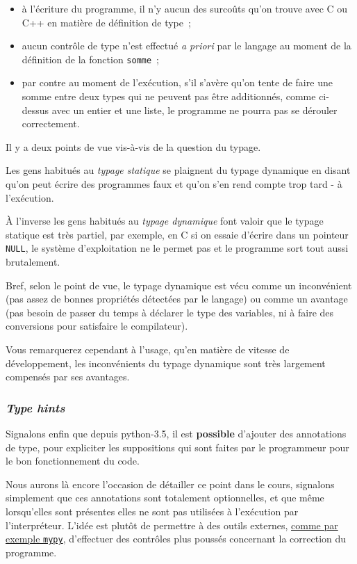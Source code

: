 \begin{itemize}
\tightlist
\item
  à l'écriture du programme, il n'y aucun des surcoûts qu'on trouve avec
  C ou C++ en matière de définition de type~;
\item
  aucun contrôle de type n'est effectué \emph{a priori} par le langage
  au moment de la définition de la fonction \texttt{somme}~;
\item
  par contre au moment de l'exécution, s'il s'avère qu'on tente de faire
  une somme entre deux types qui ne peuvent pas être additionnés, comme
  ci-dessus avec un entier et une liste, le programme ne pourra pas se
  dérouler correctement.
\end{itemize}

    Il y a deux points de vue vis-à-vis de la question du typage.

Les gens habitués au \emph{typage statique} se plaignent du typage
dynamique en disant qu'on peut écrire des programmes faux et qu'on s'en
rend compte trop tard - à l'exécution.

À l'inverse les gens habitués au \emph{typage dynamique} font valoir que
le typage statique est très partiel, par exemple, en C si on essaie
d'écrire dans un pointeur \texttt{NULL}, le système d'exploitation ne le
permet pas et le programme sort tout aussi brutalement.

    Bref, selon le point de vue, le typage dynamique est vécu comme un
inconvénient (pas assez de bonnes propriétés détectées par le langage)
ou comme un avantage (pas besoin de passer du temps à déclarer le type
des variables, ni à faire des conversions pour satisfaire le
compilateur).

Vous remarquerez cependant à l'usage, qu'en matière de vitesse de
développement, les inconvénients du typage dynamique sont très largement
compensés par ses avantages.

    \hypertarget{type-hints}{%
\subsubsection{\texorpdfstring{\emph{Type
hints}}{Type hints}}\label{type-hints}}

    Signalons enfin que depuis python-3.5, il est \textbf{possible}
d'ajouter des annotations de type, pour expliciter les suppositions qui
sont faites par le programmeur pour le bon fonctionnement du code.

Nous aurons là encore l'occasion de détailler ce point dans le cours,
signalons simplement que ces annotations sont totalement optionnelles,
et que même lorsqu'elles sont présentes elles ne sont pas utilisées à
l'exécution par l'interpréteur. L'idée est plutôt de permettre à des
outils externes, \href{http://www.mypy-lang.org}{comme par exemple
\texttt{mypy}}, d'effectuer des contrôles plus poussés concernant la
correction du programme.


    
    
    
